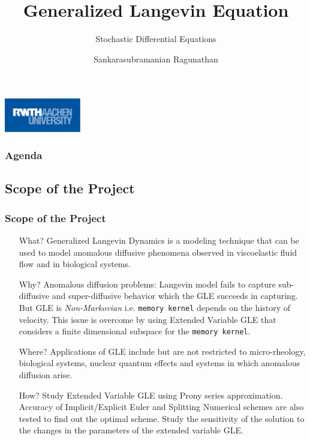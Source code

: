 \documentclass[a4paper,10pt]{beamer}
\title{Generalized Langevin Equation}
\subtitle{Stochastic Differential Equations}
\author{Sankarasubramanian Ragunathan \newline \newline 389851}
\institute{\textbf{RWTH Aachen University}}
\date{}
\begin{document}
	\begin{frame}
		\titlepage
		\centering
		\includegraphics[width=0.25\textwidth]{RWTH_Aachen_University_Logo.eps}
	\end{frame}

	\begin{frame}
	\frametitle{Agenda}
		\tableofcontents
	\end{frame}

	\begin{frame}
		\small
		\section{Scope of the Project}
		\frametitle{Scope of the Project}
		
		\begin{itemize}
			\item[What?]{Generalized Langevin Dynamics is a modeling technique that can be used to model anomalous diffusive phenomena observed in viscoelastic fluid flow and in biological systems.}
			
			\item[Why?]{Anomalous diffusion problems: Langevin model fails to capture sub-diffusive and super-diffusive behavior which the GLE succeeds in capturing. But GLE is \textit{Non-Markovian} i.e. \texttt{memory kernel} depends on the history of velocity. This issue is overcome by using Extended Variable GLE that considers a finite dimensional subspace for the \texttt{memory kernel}.}
			
			\item[Where?]{Applications of GLE include but are not restricted to micro-rheology, biological systems, nuclear quantum effects and systems in which anomalous diffusion arise.}
			
			\item[How?]{Study Extended Variable GLE using Prony series approximation. Accuracy of Implicit/Explicit Euler and Splitting Numerical schemes are also tested to find out the optimal scheme. Study the sensitivity of the solution to the changes in the parameters of the extended variable GLE.}
			
		\end{itemize}
	\end{frame}

\end{document}
